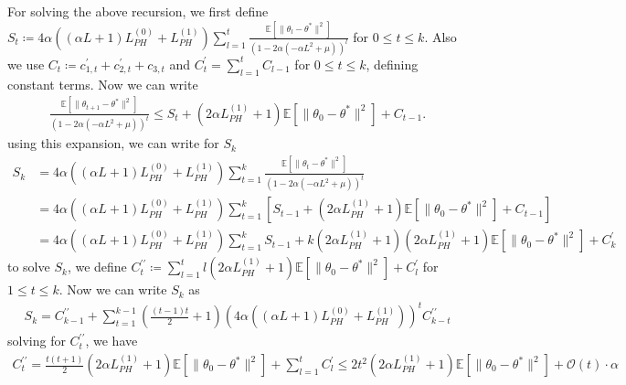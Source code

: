 \documentclass[a4paper]{article}
\newcommand{\norm}[1]{\|#1 \|}
\newcommand{\Exs}{\mathbb{E}}
\newcommand{\thetastar}{\theta^*}
\newcommand{\constLPH}[1]{L_{PH}^{(#1)}}
\newcommand{\stepsize}{\alpha}
\begin{document}
	\pagebreak
	
	For solving the above recursion, we first define $S_{t} \coloneq 4\stepsize\left(\left(\stepsize L + 1\right)\constLPH{0} + \constLPH{1}\right)\sum_{l = 1}^{t}\frac{\Exs\left[\norm{\theta_{l} - \thetastar}^{2}\right]}{\left(1 - 2\stepsize\left(-\stepsize L^{2} + \mu\right)\right)^{l}}$ for $0 \le t \le k$. Also we use $C_{t} \coloneq c_{1, t}^{\prime} + c_{2, t}^{\prime} + c_{3, t}$ and $C^{\prime}_{t} = \sum_{l = 1}^{t}C_{l - 1}$ for $0 \le t \le k$, defining constant terms. Now we can write
	\begin{align*}
		\frac{\Exs\left[\norm{\theta_{t + 1} - \thetastar}^{2}\right]}{\left(1 - 2\stepsize\left(-\stepsize L^{2} + \mu\right)\right)^{t}} \le S_{t} + \left(2\stepsize\constLPH{1} + 1\right)\Exs\left[\norm{\theta_{0} - \thetastar}^{2}\right] +‌ C_{t - 1}.‌
	\end{align*}
	using this expansion, we can write for $S_{k}$
	\begin{align*}
		S_{k} & = 4\stepsize\left(\left(\stepsize L + 1\right)\constLPH{0} + \constLPH{1}\right)\sum_{t = 1}^{k}\frac{\Exs\left[\norm{\theta_{t} - \thetastar}^{2}\right]}{\left(1 - 2\stepsize\left(-\stepsize L^{2} + \mu\right)\right)^{t}} \\
		& = 4\stepsize\left(\left(\stepsize L + 1\right)\constLPH{0} + \constLPH{1}\right)\sum_{t = 1}^{k}\left[S_{t - 1} + \left(2\stepsize\constLPH{1} + 1\right)\Exs\left[\norm{\theta_{0} - \thetastar}^{2}\right] + C_{t - 1}\right]\\
		& = 4\stepsize\left(\left(\stepsize L + 1\right)\constLPH{0} + \constLPH{1}\right)\sum_{t = 1}^{k}S_{t - 1} + k\left(2\stepsize\constLPH{1} + 1\right)\left(2\stepsize\constLPH{1} + 1\right)\Exs\left[\norm{\theta_{0} - \thetastar}^{2}\right] + C^{\prime}_{k}
	\end{align*}
	to solve $S_{k}$, we define $C^{\prime\prime}_{t} \coloneq \sum_{l = 1}^{t} l\left(2\stepsize\constLPH{1} + 1\right)\Exs\left[\norm{\theta_{0} - \thetastar}^{2}\right] + C^{\prime}_{l}$ for $1 \le t \le k$. Now we can write $S_{k}$ as
	\begin{align*}
		S_{k} = C^{\prime\prime}_{k - 1} + \sum_{t = 1}^{k - 1}\left(\frac{\left(t - 1\right)t}{2} + 1\right)\left(4\stepsize\left(\left(\stepsize L + 1\right)\constLPH{0} + \constLPH{1}\right)\right)^{t}C^{\prime\prime}_{k - t}
	\end{align*}
	solving for $C^{\prime\prime}_{t}$, we have
	\begin{align*}
		C^{\prime\prime}_{t} = \frac{t\left(t + 1\right)}{2}\left(2\stepsize\constLPH{1} + 1\right)\Exs\left[\norm{\theta_{0} - \thetastar}^{2}\right] + \sum_{l = 1}^{t}C^{\prime}_{l} \le 2t^{2}\left(2\stepsize\constLPH{1} + 1\right)\Exs\left[\norm{\theta_{0} - \thetastar}^{2}\right] + \mathcal{O}\left(t\right)\cdot \stepsize
	\end{align*}
\end{document}
